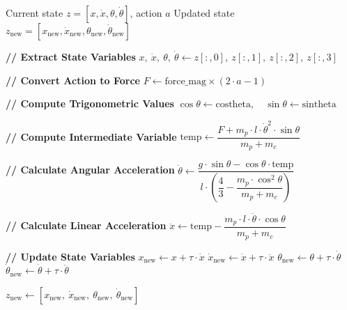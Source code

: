 \documentclass[nonacm,sigconf]{acmart}
\begin{document}
\begin{algorithm}[h]
\caption{Dynamics of Cart Pole}
\label{alg:pendulum_dynamics}
\begin{algorithmic}[1]
\Require Current state $z = [x, \dot{x}, \theta, \dot{\theta}]$, action $a$
\Ensure  Updated state $z_{\text{new}} = [x_{\text{new}}, \dot{x}_{\text{new}}, \theta_{\text{new}}, \dot{\theta}_{\text{new}}]$

\State \textbf{// Extract State Variables}
\State $x,\ \dot{x},\ \theta,\ \dot{\theta}
       \gets z[:,0],\ z[:,1],\ z[:,2],\ z[:,3]$

\State \textbf{// Convert Action to Force}
\State $F \gets \text{force\_mag} \times (2 \cdot a - 1)$

\State \textbf{// Compute Trigonometric Values}
\State $\cos\theta \gets \text{costheta},\quad \sin\theta \gets \text{sintheta}$

\State \textbf{// Compute Intermediate Variable}
\State $\text{temp} \gets
       \dfrac{F + m_p \cdot l \cdot \dot{\theta}^2 \cdot \sin\theta}
             {m_p + m_c}$

\State \textbf{// Calculate Angular Acceleration}
\State $\ddot{\theta} \gets
       \dfrac{g \cdot \sin\theta - \cos\theta \cdot \text{temp}}
             {l \cdot \left(\dfrac{4}{3}
              - \dfrac{m_p \cdot \cos^2\!\theta}{m_p + m_c}\right)}$

\State \textbf{// Calculate Linear Acceleration}
\State $\ddot{x} \gets \text{temp}
       - \dfrac{m_p \cdot l \cdot \ddot{\theta} \cdot \cos\theta}{m_p + m_c}$

\State \textbf{// Update State Variables}
\State $x_{\text{new}}         \gets x         + \tau \cdot \dot{x}$
\State $\dot{x}_{\text{new}}   \gets \dot{x}   + \tau \cdot \ddot{x}$
\State $\theta_{\text{new}}    \gets \theta     + \tau \cdot \dot{\theta}$
\State $\dot{\theta}_{\text{new}} \gets \dot{\theta} + \tau \cdot \ddot{\theta}$

\State \Return
       $z_{\text{new}} \gets
       [x_{\text{new}},\ \dot{x}_{\text{new}},\
        \theta_{\text{new}},\ \dot{\theta}_{\text{new}}]$
\end{algorithmic}
\end{algorithm}



\newpage
\end{document}
